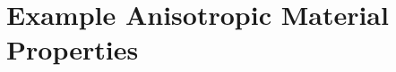 % 
%





\chapterimage{\noheaderimage}

\chapter{Example Anisotropic Material Properties\label{chap:ExampleProperties}}
